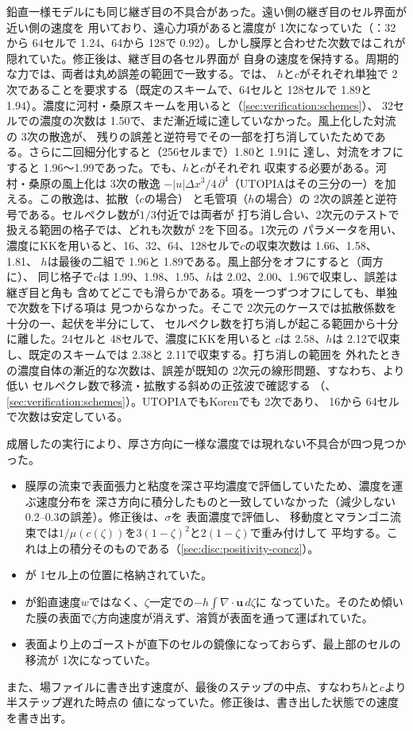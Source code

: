 鉛直一様モデルにも同じ継ぎ目の不具合があった。遠い側の継ぎ目のセル界面が近い側の速度を
用いており、遠心力項があると濃度が 1次になっていた（：32から 64セルで
1.24、64から 128で 0.92）。しかし膜厚と合わせた次数ではこれが隠れていた。修正後は、継ぎ目の各セル界面が
自身の速度を保持する。周期的な力では、両者は丸め誤差の範囲で一致する。では、
$h$と$c$がそれぞれ単独で 2次であることを要求する（既定のスキームで、64セルと 128セルで
1.89と 1.94）。濃度に河村・桑原スキームを用いると（\cref{sec:verification:schemes}）、
32セルでの濃度の次数は 1.50で、まだ漸近域に達していなかった。風上化した対流の 3次の散逸が、
残りの誤差と逆符号でその一部を打ち消していたためである。さらに二回細分化すると（256セルまで）1.80と 1.91に
達し、対流をオフにすると 1.96〜1.99であった。でも、$h$と$c$がそれぞれ
収束する必要がある。河村・桑原の風上化は 3次の散逸
$-|u|\Delta x^3/4\,\partial^4$（UTOPIAはその三分の一）を加える。この散逸は、拡散（$c$の場合）
と毛管項（$h$の場合）の 2次の誤差と逆符号である。セルペクレ数が$1/3$付近では両者が
打ち消し合い、2次元のテストで扱える範囲の格子では、どれも次数が 2を下回る。1次元の
パラメータを用い、濃度にKKを用いると、16、32、64、128セルで$c$の収束次数は 1.66、1.58、1.81、
$h$は最後の二組で 1.96と 1.89である。風上部分をオフにすると（両方に）、
同じ格子で$c$は 1.99、1.98、1.95、$h$は 2.02、2.00、1.96で収束し、誤差は継ぎ目と角も
含めてどこでも滑らかである。項を一つずつオフにしても、単独で次数を下げる項は
見つからなかった。そこで 2次元のケースでは拡散係数を十分の一、起伏を半分にして、
セルペクレ数を打ち消しが起こる範囲から十分に離した。24セルと 48セルで、濃度にKKを用いると
$c$は 2.58、$h$は 2.12で収束し、既定のスキームでは 2.38と 2.11で収束する。打ち消しの範囲を
外れたときの濃度自体の漸近的な次数は、誤差が既知の 2次元の線形問題、すなわち、より低い
セルペクレ数で移流・拡散する斜めの正弦波で確認する
（、\cref{sec:verification:schemes}）。UTOPIAでもKorenでも 2次であり、
16から 64セルで次数は安定している。

成層したの実行により、厚さ方向に一様な濃度では現れない不具合が四つ見つかった。
\begin{itemize}
  \item 膜厚の流束で表面張力と粘度を深さ平均濃度で評価していたため、濃度を運ぶ速度分布を
    深さ方向に積分したものと一致していなかった（減少しない 0.2--0.3の誤差）。修正後は、$\sigma$を
    表面濃度で評価し、
    移動度とマランゴニ流束では$1/\mu(c(\zeta))$を$3(1-\zeta)^2$と$2(1-\zeta)$で重み付けして
    平均する。これは上の積分そのものである（\cref{sec:disc:positivity-concz}）。
  \item {}が 1セル上の位置に格納されていた。
  \item {}が鉛直速度$w$ではなく、$\zeta$一定での$-h\int\nabla\cdot\mathbf u\,d\zeta$に
    なっていた。そのため傾いた膜の表面で$\zeta$方向速度が消えず、溶質が表面を通って運ばれていた。
  \item 表面より上のゴーストが直下のセルの鏡像になっておらず、最上部のセルの移流が
    1次になっていた。
\end{itemize}
また、場ファイルに書き出す速度が、最後のステップの中点、すなわち$h$と$c$より半ステップ遅れた時点の
値になっていた。修正後は、書き出した状態での速度を書き出す。

